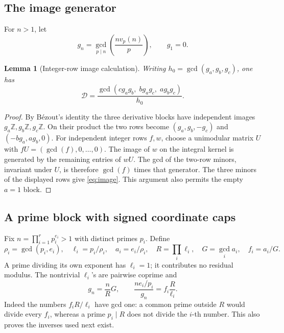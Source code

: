 \documentclass[11pt,a4paper]{article}
\newtheorem{lemma}[theorem]{Lemma}
\theoremstyle{definition}\newtheorem{question}[theorem]{Question}
\theoremstyle{remark}\newtheorem{remark}[theorem]{Remark}
\newcommand{\Z}{\mathbb Z}\newcommand{\R}{\mathbb R}
\newcommand{\Dgen}{\mathcal D}\newcommand{\mpr}{m_{\mathrm{prim}}}
\begin{document}
\subsection{The image generator}
For \(n>1\), let
\[
 g_n=\gcd_{p\mid n}\left(\frac{n v_p(n)}p\right),\qquad g_1=0.
\]
\begin{lemma}[Integer-row image calculation]\label{lem:image}
Writing \(h_0=\gcd(g_a,g_b,g_c)\), one has
\begin{equation}\label{eq:image}
 \Dgen=\frac{\gcd(cg_ag_b,\;bg_ag_c,\;ag_bg_c)}{h_0}.
\end{equation}
\end{lemma}
\begin{proof}
By B\'ezout's identity the three derivative blocks have independent
images \(g_a\Z,g_b\Z,g_c\Z\). On their product the two rows become
\((g_a,g_b,-g_c)\) and \((-bg_a,ag_b,0)\).
For independent integer rows \(f,w\), choose a unimodular matrix \(U\)
with \(fU=(\gcd(f),0,\ldots,0)\). The image of \(w\) on the integral
kernel is generated by the remaining entries of \(wU\).
The gcd of the two-row minors, invariant under \(U\), is therefore
\(\gcd(f)\) times that generator. The three minors of the displayed
rows give \eqref{eq:image}. This argument also permits the empty
\(a=1\) block.
\end{proof}

\subsection{A prime block with signed coordinate caps}
Fix \(n=\prod_{i=1}^r p_i^{e_i}>1\) with distinct primes \(p_i\). Define
\begin{equation}\label{eq:block-data}
 \rho_i=\gcd(p_i,e_i),\quad \ell_i=p_i/\rho_i,\quad
 a_i=e_i/\rho_i,\quad
 R=\prod_i\ell_i,\quad G=\gcd_i a_i,\quad f_i=a_i/G.
\end{equation}
A prime dividing its own exponent has \(\ell_i=1\); it contributes no
residual modulus. The nontrivial \(\ell_i\)'s are pairwise coprime and
\begin{equation}\label{eq:block-gcd}
 g_n=\frac nR G,\qquad
 \frac{n e_i/p_i}{g_n}=f_i\frac R{\ell_i}.
\end{equation}
Indeed the numbers \(f_iR/\ell_i\) have gcd one: a common prime outside
\(R\) would divide every \(f_i\), whereas a prime \(p_i\mid R\) does not
divide the \(i\)-th number. This also proves the inverses used next exist.
\end{document}
